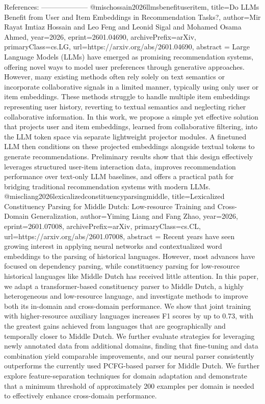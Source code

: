         References:
        --------------------
        @misc{hossain2026llmsbenefituseritem,
      title={Do LLMs Benefit from User and Item Embeddings in Recommendation Tasks?}, 
      author={Mir Rayat Imtiaz Hossain and Leo Feng and Leonid Sigal and Mohamed Osama Ahmed},
      year={2026},
      eprint={2601.04690},
      archivePrefix={arXiv},
      primaryClass={cs.LG},
      url={https://arxiv.org/abs/2601.04690},
      abstract = {Large Language Models (LLMs) have emerged as promising recommendation systems, offering novel ways to model user preferences through generative approaches. However, many existing methods often rely solely on text semantics or incorporate collaborative signals in a limited manner, typically using only user or item embeddings. These methods struggle to handle multiple item embeddings representing user history, reverting to textual semantics and neglecting richer collaborative information. In this work, we propose a simple yet effective solution that projects user and item embeddings, learned from collaborative filtering, into the LLM token space via separate lightweight projector modules. A finetuned LLM then conditions on these projected embeddings alongside textual tokens to generate recommendations. Preliminary results show that this design effectively leverages structured user-item interaction data, improves recommendation performance over text-only LLM baselines, and offers a practical path for bridging traditional recommendation systems with modern LLMs.}
}@misc{liang2026lexicalizedconstituencyparsingmiddle,
      title={Lexicalized Constituency Parsing for Middle Dutch: Low-resource Training and Cross-Domain Generalization}, 
      author={Yiming Liang and Fang Zhao},
      year={2026},
      eprint={2601.07008},
      archivePrefix={arXiv},
      primaryClass={cs.CL},
      url={https://arxiv.org/abs/2601.07008},
      abstract = {Recent years have seen growing interest in applying neural networks and contextualized word embeddings to the parsing of historical languages. However, most advances have focused on dependency parsing, while constituency parsing for low-resource historical languages like Middle Dutch has received little attention. In this paper, we adapt a transformer-based constituency parser to Middle Dutch, a highly heterogeneous and low-resource language, and investigate methods to improve both its in-domain and cross-domain performance. We show that joint training with higher-resource auxiliary languages increases F1 scores by up to 0.73, with the greatest gains achieved from languages that are geographically and temporally closer to Middle Dutch. We further evaluate strategies for leveraging newly annotated data from additional domains, finding that fine-tuning and data combination yield comparable improvements, and our neural parser consistently outperforms the currently used PCFG-based parser for Middle Dutch. We further explore feature-separation techniques for domain adaptation and demonstrate that a minimum threshold of approximately 200 examples per domain is needed to effectively enhance cross-domain performance.}
}
